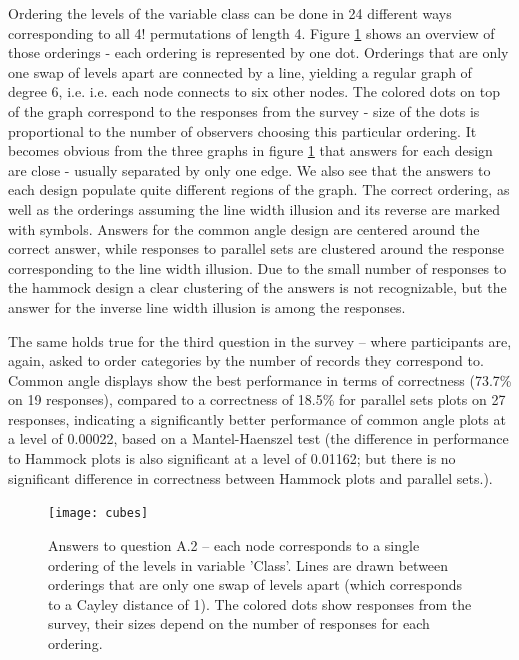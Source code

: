 Ordering the levels of the variable class can be done in 24 different ways corresponding to all 4! permutations of length 4. 
Figure \ref{cubes} shows an overview of those orderings - each ordering is represented by one dot. Orderings that are only one swap of levels apart are connected by a line, yielding a regular graph of degree 6, i.e.  i.e.  each node connects to  six other nodes. The colored dots on top of the graph correspond to the responses from the survey - size of the dots is proportional to the number of observers choosing this particular ordering. It becomes obvious from the three graphs in figure \ref{cubes} that  answers for each design are close - usually separated by only one edge. We also see that the answers to each design populate quite  different regions of the graph. 
The correct ordering, as well as the orderings assuming the line width illusion and its reverse are marked with symbols. Answers for the common angle design are centered around the correct answer, while responses to parallel sets are clustered around the response corresponding to the line width illusion. Due to the small number of responses to the hammock design a clear clustering of the answers is not recognizable, but the answer for the inverse line width illusion is among the responses.

The same holds true for the third question in the survey -- where participants are, again, asked to order categories by the number of records they correspond to. Common angle displays show the best performance in terms of correctness (73.7\% on 19 responses), compared to a correctness of 18.5\% for parallel sets plots on 27 responses, indicating a significantly better performance of common angle plots at a level of 0.00022, based on a Mantel-Haenszel test (the difference in performance to Hammock plots is also significant at a level of 0.01162; but there is no significant difference in correctness between Hammock plots and parallel sets.).
\begin{figure}
\texttt{[image: cubes]}
\caption{Answers to question A.2 -- each node corresponds to a single ordering of the levels in variable 'Class'. Lines are drawn between orderings that are only one swap of levels apart (which corresponds to a Cayley distance of 1). The colored dots show responses from the survey, their sizes depend on the number of responses for each ordering. }
\label{cubes}
\end{figure}

